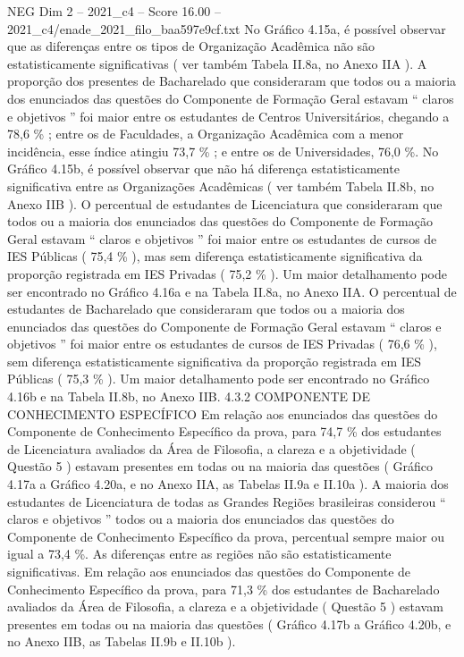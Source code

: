 \begin{textsample}{NEG Dim 2 – 2021\_c4 – Score 16.00 – 2021\_c4/enade\_2021\_filo\_baa597e9cf.txt}
No Gráfico 4.15a, é possível observar que as diferenças entre os tipos de Organização Acadêmica não são estatisticamente significativas ( ver também Tabela II.8a, no Anexo IIA ).
A proporção dos presentes de Bacharelado que consideraram que todos ou a maioria dos enunciados das questões do Componente de Formação Geral estavam “ claros e objetivos ” foi maior entre os estudantes de Centros Universitários, chegando a 78,6 \% ; entre os de Faculdades, a Organização Acadêmica com a menor incidência, esse índice atingiu 73,7 \% ; e entre os de Universidades, 76,0 \%.
No Gráfico 4.15b, é possível observar que não há diferença estatisticamente significativa entre as Organizações Acadêmicas ( ver também Tabela II.8b, no Anexo IIB ).
O percentual de estudantes de Licenciatura que consideraram que todos ou a maioria dos enunciados das questões do Componente de Formação Geral estavam “ claros e objetivos ” foi maior entre os estudantes de cursos de IES Públicas ( 75,4 \% ), mas sem diferença estatisticamente significativa da proporção registrada em IES Privadas ( 75,2 \% ).
Um maior detalhamento pode ser encontrado no Gráfico 4.16a e na Tabela II.8a, no Anexo IIA.
O percentual de estudantes de Bacharelado que consideraram que todos ou a maioria dos enunciados das questões do Componente de Formação Geral estavam “ claros e objetivos ” foi maior entre os estudantes de cursos de IES Privadas ( 76,6 \% ), sem diferença estatisticamente significativa da proporção registrada em IES Públicas ( 75,3 \% ).
Um maior detalhamento pode ser encontrado no Gráfico 4.16b e na Tabela II.8b, no Anexo IIB. 4.3.2 COMPONENTE DE CONHECIMENTO ESPECÍFICO Em relação aos enunciados das questões do Componente de Conhecimento Específico da prova, para 74,7 \% dos estudantes de Licenciatura avaliados da Área de Filosofia, a clareza e a objetividade ( Questão 5 ) estavam presentes em todas ou na maioria das questões ( Gráfico 4.17a a Gráfico 4.20a, e no Anexo IIA, as Tabelas II.9a e II.10a ).
A maioria dos estudantes de Licenciatura de todas as Grandes Regiões brasileiras considerou “ claros e objetivos ” todos ou a maioria dos enunciados das questões do Componente de Conhecimento Específico da prova, percentual sempre maior ou igual a 73,4 \%.
As diferenças entre as regiões não são estatisticamente significativas.
Em relação aos enunciados das questões do Componente de Conhecimento Específico da prova, para 71,3 \% dos estudantes de Bacharelado avaliados da Área de Filosofia, a clareza e a objetividade ( Questão 5 ) estavam presentes em todas ou na maioria das questões ( Gráfico 4.17b a Gráfico 4.20b, e no Anexo IIB, as Tabelas II.9b e II.10b ).

\end{textsample}
